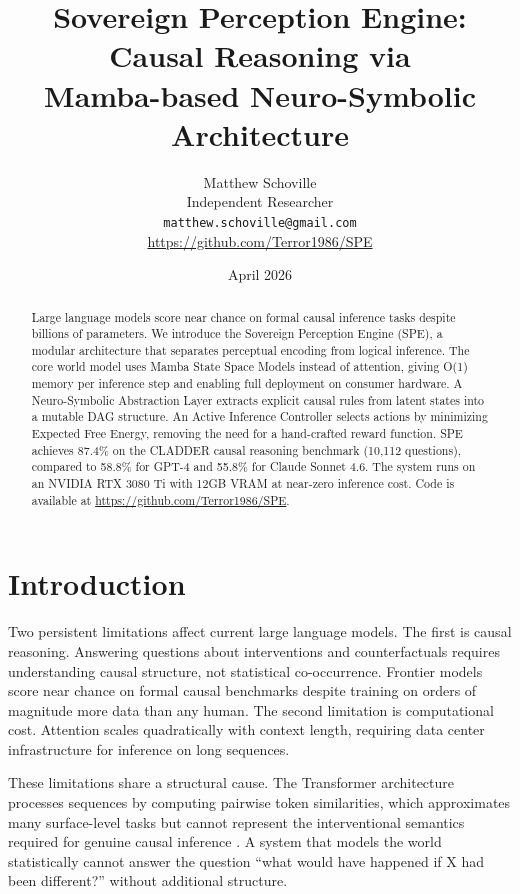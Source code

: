 \documentclass{article}
\title{\textbf{Sovereign Perception Engine: Causal Reasoning via\\
Mamba-based Neuro-Symbolic Architecture}}
\author{
Matthew Schoville\\
Independent Researcher\\
\texttt{matthew.schoville@gmail.com}\\
\url{https://github.com/Terror1986/SPE}
}
\date{April 2026}
\begin{document}
\maketitle

\begin{abstract}
Large language models score near chance on formal causal inference tasks
despite billions of parameters. We introduce the Sovereign Perception
Engine (SPE), a modular architecture that separates perceptual encoding
from logical inference. The core world model uses Mamba State Space Models
instead of attention, giving O(1) memory per inference step and enabling
full deployment on consumer hardware. A Neuro-Symbolic Abstraction Layer
extracts explicit causal rules from latent states into a mutable DAG
structure. An Active Inference Controller selects actions by minimizing
Expected Free Energy, removing the need for a hand-crafted reward function.
SPE achieves 87.4\% on the CLADDER causal reasoning benchmark (10,112
questions), compared to 58.8\% for GPT-4 and 55.8\% for Claude Sonnet 4.6.
The system runs on an NVIDIA RTX 3080 Ti with 12GB VRAM at near-zero
inference cost. Code is available at \url{https://github.com/Terror1986/SPE}.
\end{abstract}

\section{Introduction}

Two persistent limitations affect current large language models. The first
is causal reasoning. Answering questions about interventions and
counterfactuals requires understanding causal structure, not statistical
co-occurrence. Frontier models score near chance on formal causal benchmarks
\cite{jin2023cladder} despite training on orders of magnitude more data
than any human. The second limitation is computational cost. Attention
scales quadratically with context length, requiring data center
infrastructure for inference on long sequences.

These limitations share a structural cause. The Transformer architecture
processes sequences by computing pairwise token similarities, which
approximates many surface-level tasks but cannot represent the interventional
semantics required for genuine causal inference \cite{zevcevic2023causal}.
A system that models the world statistically cannot answer the question
``what would have happened if X had been different?'' without additional
structure.
\end{document}
